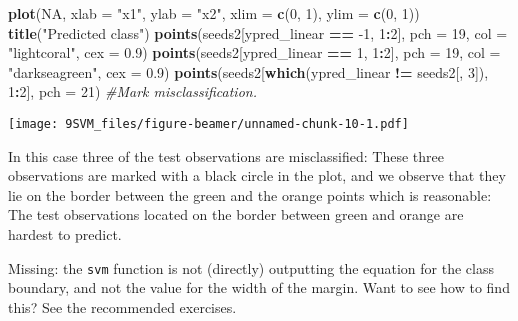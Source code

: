 \documentclass[10pt,ignorenonframetext,]{beamer}
\newenvironment{Shaded}{\begin{snugshade}}{\end{snugshade}}
\newcommand{\KeywordTok}[1]{\textcolor[rgb]{0.13,0.29,0.53}{\textbf{#1}}}
\newcommand{\DataTypeTok}[1]{\textcolor[rgb]{0.13,0.29,0.53}{#1}}
\newcommand{\DecValTok}[1]{\textcolor[rgb]{0.00,0.00,0.81}{#1}}
\newcommand{\FloatTok}[1]{\textcolor[rgb]{0.00,0.00,0.81}{#1}}
\newcommand{\StringTok}[1]{\textcolor[rgb]{0.31,0.60,0.02}{#1}}
\newcommand{\CommentTok}[1]{\textcolor[rgb]{0.56,0.35,0.01}{\textit{#1}}}
\newcommand{\OtherTok}[1]{\textcolor[rgb]{0.56,0.35,0.01}{#1}}
\newcommand{\OperatorTok}[1]{\textcolor[rgb]{0.81,0.36,0.00}{\textbf{#1}}}
\newcommand{\NormalTok}[1]{#1}
\begin{document}
\begin{frame}[fragile]
\begin{Shaded}
\begin{Highlighting}[]
\KeywordTok{plot}\NormalTok{(}\OtherTok{NA}\NormalTok{, }\DataTypeTok{xlab =} \StringTok{"x1"}\NormalTok{, }\DataTypeTok{ylab =} \StringTok{"x2"}\NormalTok{, }\DataTypeTok{xlim =} \KeywordTok{c}\NormalTok{(}\DecValTok{0}\NormalTok{, }\DecValTok{1}\NormalTok{), }\DataTypeTok{ylim =} \KeywordTok{c}\NormalTok{(}\DecValTok{0}\NormalTok{, }\DecValTok{1}\NormalTok{))}
\KeywordTok{title}\NormalTok{(}\StringTok{"Predicted class"}\NormalTok{)}
\KeywordTok{points}\NormalTok{(seeds2[ypred_linear }\OperatorTok{==}\StringTok{ }\DecValTok{-1}\NormalTok{, }\DecValTok{1}\OperatorTok{:}\DecValTok{2}\NormalTok{], }\DataTypeTok{pch =} \DecValTok{19}\NormalTok{, }\DataTypeTok{col =} \StringTok{"lightcoral"}\NormalTok{, }
    \DataTypeTok{cex =} \FloatTok{0.9}\NormalTok{)}
\KeywordTok{points}\NormalTok{(seeds2[ypred_linear }\OperatorTok{==}\StringTok{ }\DecValTok{1}\NormalTok{, }\DecValTok{1}\OperatorTok{:}\DecValTok{2}\NormalTok{], }\DataTypeTok{pch =} \DecValTok{19}\NormalTok{, }\DataTypeTok{col =} \StringTok{"darkseagreen"}\NormalTok{, }
    \DataTypeTok{cex =} \FloatTok{0.9}\NormalTok{)}
\KeywordTok{points}\NormalTok{(seeds2[}\KeywordTok{which}\NormalTok{(ypred_linear }\OperatorTok{!=}\StringTok{ }\NormalTok{seeds2[, }\DecValTok{3}\NormalTok{]), }\DecValTok{1}\OperatorTok{:}\DecValTok{2}\NormalTok{], }\DataTypeTok{pch =} \DecValTok{21}\NormalTok{)  }\CommentTok{#Mark misclassification.}
\end{Highlighting}
\end{Shaded}

\texttt{[image: 9SVM\_files/figure-beamer/unnamed-chunk-10-1.pdf]}

\normalsize

\end{frame}

\begin{frame}[fragile]

In this case three of the test observations are misclassified: These
three observations are marked with a black circle in the plot, and we
observe that they lie on the border between the green and the orange
points which is reasonable: The test observations located on the border
between green and orange are hardest to predict.

Missing: the \texttt{svm} function is not (directly) outputting the
equation for the class boundary, and not the value for the width of the
margin. Want to see how to find this? See the recommended exercises.

\end{frame}
\end{document}
